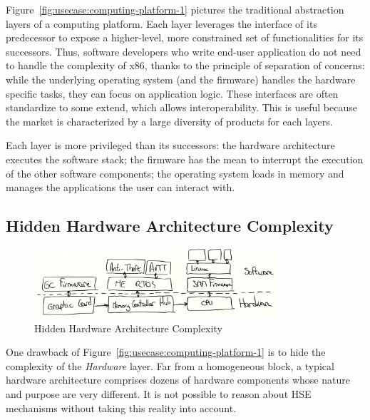 Figure~\ref{fig:usecase:computing-platform-1} pictures the traditional
abstraction layers of a computing platform.
%
Each layer leverages the interface of its predecessor to expose a higher-level,
more constrained set of functionalities for its successors.
%
Thus, software developers who write end-user application do not need to handle
the complexity of x86, thanks to the principle of separation of concerns: while
the underlying operating system (and the firmware) handles the hardware specific
tasks, they can focus on application logic.
%
These interfaces are often standardize to some extend, which allows
interoperability.
%
This is useful because the market is characterized by a large diversity of
products for each layers.

Each layer is more privileged than its successors:
%
the hardware architecture executes the software stack;
%
the firmware has the mean to interrupt the execution of the other software
components;
%
the operating system loads in memory and manages the applications the user can
interact with.

\subsection{Hidden Hardware Architecture Complexity}

\begin{figure}
  \centering
  \includegraphics[width=0.8\textwidth]{Figures/intro-computing-platform.jpg}
  \caption{Hidden Hardware Architecture Complexity}
  \label{fig:usecase:computing-platform-2}
\end{figure}

One drawback of Figure~\ref{fig:usecase:computing-platform-1} is to hide the
complexity of the \emph{Hardware} layer.
%
Far from a homogeneous block, a typical hardware architecture comprises dozens
of hardware components whose nature and purpose are very different.
%
It is not possible to reason about HSE mechanisms without taking this reality
into account.

